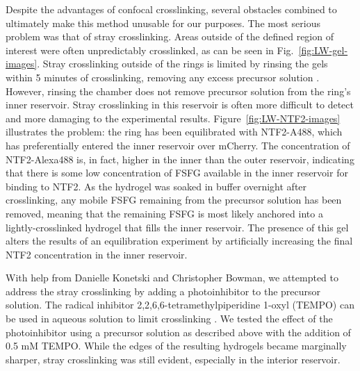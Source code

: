 Despite the advantages of confocal crosslinking, several obstacles combined to ultimately make this method unusable for our purposes.  The most serious problem was that of stray crosslinking.  Areas outside of the defined region of interest were often unpredictably crosslinked, as can be seen in Fig.~\ref{fig:LW-gel-images}.  Stray crosslinking outside of the rings is limited by rinsing the gels within 5 minutes of crosslinking, removing any excess precursor solution \cite{paustian13}.  However, rinsing the chamber does not remove precursor solution from the ring's inner reservoir.  Stray crosslinking in this reservoir is often more difficult to detect and more damaging to the experimental results. Figure~\ref{fig:LW-NTF2-images} illustrates the problem: the ring has been equilibrated with NTF2-A488, which has preferentially entered the inner reservoir over mCherry.  The concentration of NTF2-Alexa488 is, in fact, higher in the inner than the outer reservoir, indicating that there is some low concentration of FSFG available in the inner reservoir for binding to NTF2.  As the hydrogel was soaked in buffer overnight after crosslinking, any mobile FSFG remaining from the precursor solution has been removed, meaning that the remaining FSFG is most likely anchored into a lightly-crosslinked hydrogel that fills the inner reservoir.  The presence of this gel alters the results of an equilibration experiment by artificially increasing the final NTF2 concentration in the inner reservoir.

With help from Danielle Konetski and Christopher Bowman, we attempted to address the stray crosslinking by adding a photoinhibitor to the precursor solution.  The radical inhibitor 2,2,6,6-tetramethylpiperidine 1-oxyl (TEMPO) can be used in aqueous solution to limit crosslinking \cite{chatani14}.  We tested the effect of the photoinhibitor using a precursor solution as described above with the addition of 0.5 mM TEMPO.  While the edges of the resulting hydrogels became marginally sharper, stray crosslinking was still evident, especially in the interior reservoir.

